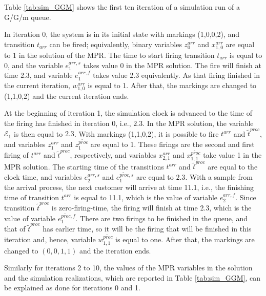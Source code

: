 \documentclass[suppldata]{interact}
\theoremstyle{plain}
\theoremstyle{definition}
\theoremstyle{remark}
\begin{document}
\noindent
Table \ref{tab:sim_GGM} shows the first ten iteration of a simulation run of a G/G/m queue.

In iteration 0, the system is in its initial state with markings (1,0,0,2), and transition $t_{arr}$ can be fired; equivalently, binary variables $z^{arr}_0$ and $x^{arr}_{1,0}$ are equal to $1$ in the solution of the MPR. The time to start firing transition $t_{arr}$ is equal to $0$, and the variable $e^{arr,s}_{1}$ takes value $0$ in the MPR solution. The fire will finish at time 2.3, and variable $e^{arr,f}_{1}$ takes value 2.3 equivalently. %
As that firing finished in the current iteration, $w^{arr}_{1,0}$ is equal to 1. After that, the markings are changed to (1,1,0,2) and the current iteration ends. 

At the beginning of iteration 1, the simulation clock is advanced to the time of the firing has finished in iteration 0, i.e., $2.3$. In the MPR solution, the variable $\mathcal{E}_1$ is then equal to $2.3$. With markings (1,1,0,2), it is possible to fire $t^{arr}$ and $\tilde{t}^{proc}$, and variables $z_1^{arr}$ and $z_1^{\tilde{proc}}$ are equal to 1. These firings are the second and first firing of $t^{arr}$ and $\tilde{t}^{proc}$, respectively, and variables $x_{2,1}^{arr}$ and $x_{1,1}^{\tilde{proc}}$ take value 1 in the MPR solution. The starting time of the transitions $t^{arr}$ and $\tilde{t}^{proc}$ are equal to the clock time, and variables $e^{arr,s}_{2}$ and $e^{\tilde{proc},s}_{1}$ are equal to $2.3$. With a sample from the arrival process, the next customer will arrive at time 11.1, i.e., the finishing time of transition $t^{arr}$ is equal to 11.1, which is the value of variable $e^{arr,f}_{2}$. Since transition $\tilde{t}^{proc}$ is zero-firing-time, the firing will finish at time 2.3, which is the value of variable $e^{\tilde{proc},f}_{1}$. There are two firings to be finished in the queue, and that of $\tilde{t}^{proc}$ has earlier time, so it will be the firing that will be finished in this iteration and, hence, variable $w^{\tilde{proc}}_{1,1}$ is equal to one. After that, the markings are changed to $(0,0,1,1)$ and the iteration ends. 

Similarly for iterations 2 to 10, the values of the MPR variables in the solution and the simulation realizations, %
which are reported in Table \ref{tab:sim_GGM}, can be explained as done for iterations 0 and 1.
 
\end{document}
